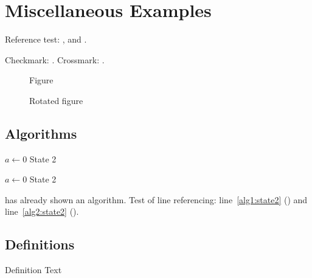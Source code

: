 \documentclass[../thesis-example]{subfiles}
\begin{document}
\section{Miscellaneous Examples}
\label{ssec:example}

Reference test: ,  and .

\begin{ltgexample}
Checkmark: \dingcheck.
Crossmark: \dingcross.
\end{ltgexample}

\begin{figure}
  \missingfigure{}
  \caption{Figure}
  \label{fig:Abbildung}
\end{figure}

\begin{landscape}
  \begin{figure}
    \missingfigure{}
    \caption{Rotated figure}
    \label{fig:AbbildungGedreht}
  \end{figure}
\end{landscape}

\subsection{Algorithms}

\begin{algorithm}
  \caption{$algo$}
  \label{alg:example}
  \begin{algorithmic}[1]
    \State $a \gets 0$
    \State State 2\label{alg1:state2}
  \end{algorithmic}
\end{algorithm}

\begin{algorithm}
  \caption{Algorithm 2}
  \label{alg:example2}
  \begin{algorithmic}[1]
    \State $a \gets 0$
    \State State 2\label{alg2:state2}
  \end{algorithmic}
\end{algorithm}

 has already shown an algorithm.
Test of line referencing: line~\ref{alg1:state2} () and line~\ref{alg2:state2} ().

\subsection{Definitions}
\begin{definition}[Title]
  \label{def:def1}
  Definition Text
\end{definition}
\end{document}
